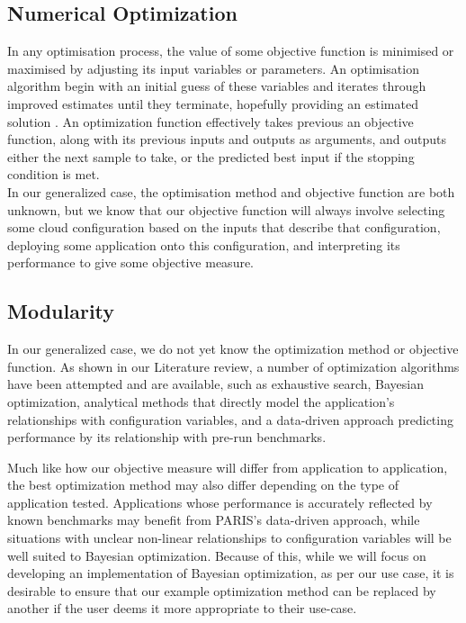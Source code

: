 \documentclass{report}
\begin{document}
\subsection{Numerical Optimization}
In any optimisation process, the value of some objective function is minimised or maximised by adjusting its input variables or parameters. An optimisation algorithm begin with an initial guess of these variables and iterates through improved estimates until they terminate, hopefully providing an estimated solution \cite{Nocedal2006}. An optimization function effectively takes previous an objective function, along with its previous inputs and outputs as arguments, and outputs either the next sample to take, or the predicted best input if the stopping condition is met. \\
In our generalized case, the optimisation method and objective function are both unknown, but we know that our objective function will always involve selecting some cloud configuration based on the inputs that describe that configuration, deploying some application onto this configuration, and interpreting its performance to give some objective measure.
 

\subsection{Modularity}
In our generalized case, we do not yet know the optimization method or objective function. As shown in our Literature review, a number of optimization algorithms have been attempted and are available, such as exhaustive search, Bayesian optimization\cite{Alipourfard2017}, analytical methods that directly model the application's relationships with configuration variables\cite{Venkataraman2016}, and a data-driven approach predicting performance by its relationship with pre-run benchmarks\cite{Yadwadkar2017}.

Much like how our objective measure will differ from application to application, the best optimization method may also differ depending on the type of application tested. Applications whose performance is accurately reflected by known benchmarks may benefit from PARIS's data-driven approach, while situations with unclear non-linear relationships to configuration variables will be well suited to Bayesian optimization. Because of this, while we will focus on developing an implementation of Bayesian optimization, as per our use case, it is desirable to ensure that our example optimization method can be replaced by another if the user deems it more appropriate to their use-case.
\end{document}

